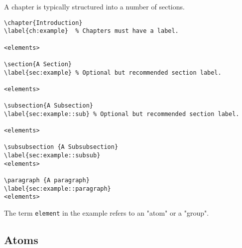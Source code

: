 \begin{example}[Sections]

A chapter is typically structured into a number of sections.

\begin{lstlisting}
\chapter{Introduction}
\label{ch:example}  % Chapters must have a label.
   
<elements>

\section{A Section}
\label{sec:example} % Optional but recommended section label.   

<elements>

\subsection{A Subsection}
\label{sec:example::sub} % Optional but recommended section label.   

<elements>

\subsubsection {A Subsubsection}
\label{sec:example::subsub}
<elements>

\paragraph {A paragraph}
\label{sec:example::paragraph}
<elements>

\end{lstlisting}

The term \lstinline`element` in the example refers to an "atom" or a "group".
\end{example}



\subsection{Atoms}
\label{sec:mtl::atoms}

